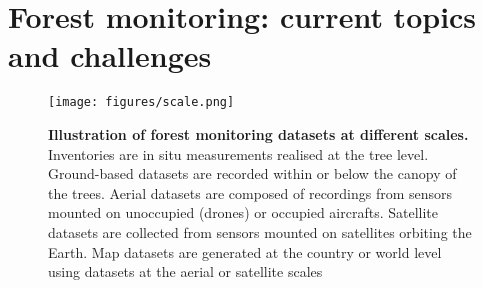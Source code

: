 \documentclass{CUP-JNL-DTM}%
\theoremstyle{definition}
\numberwithin{equation}{section}
\begin{document}
\section{Forest monitoring: current topics and challenges}
\label{sec:forest_topics_and_challenges}

\begin{figure}[t]%
\texttt{[image: figures/scale.png]}
\caption{
\textbf{Illustration of forest monitoring datasets at different scales.} Inventories are in situ measurements realised at the tree level. Ground-based datasets are recorded within or below the canopy of the trees. Aerial datasets are composed of recordings from sensors mounted on unoccupied (drones) or occupied aircrafts. Satellite datasets are collected from sensors mounted on satellites orbiting the Earth. Map datasets are generated at the country or world level using datasets at the aerial or satellite scales}
\label{fig:scale}
\end{figure}
\end{document}
